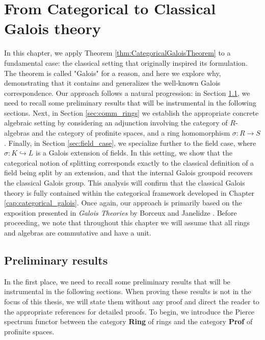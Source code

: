 \chapter{From Categorical to Classical Galois theory}
\label{cap:categorical_classical}

In this chapter, we apply Theorem \ref{thm:CategoricalGaloisTheorem} to a fundamental case: the classical setting that originally inspired its formulation. The theorem is called "Galois" for a reason, and here we explore why, demonstrating that it contains and generalizes the well-known Galois correspondence. Our approach follows a natural progression: in Section \ref{sec:preliminary_results}, we need to recall some preliminary results that will be instrumental in the following sections. Next, in Section \ref{sec:comm_rings} we establish the appropriate concrete algebraic setting by considering an adjunction involving the category of $R$-algebras and the category of profinite spaces, and a ring homomorphism $\sigma:R\to S$. Finally, in Section \ref{sec:field_case}, we specialize further to the field case, where $\sigma:K\hookrightarrow L$ is a Galois extension of fields. In this setting, we show that the categorical notion of splitting corresponds exactly to the classical definition of a field being split by an extension, and that the internal Galois groupoid recovers the classical Galois group. This analysis will confirm that the classical Galois theory is fully contained within the categorical framework developed in Chapter \ref{cap:categorical_galois}. Once again, our approach is primarily based on the exposition presented in \textit{Galois Theories} by Borceux and Janelidze \cite{borceux2001galois}. Before proceeding, we note that throughout this chapter we will assume that all rings and algebras are commutative and have a unit.

\section{Preliminary results}
\label{sec:preliminary_results}

In the first place, we need to recall some preliminary results that will be instrumental in the following sections. When proving these results is not in the focus of this thesis, we will state them without any proof and direct the reader to the appropriate references for detailed proofs. To begin, we introduce the Pierce spectrum functor between the category \textbf{Ring} of rings and the category \textbf{Prof} of profinite spaces.

